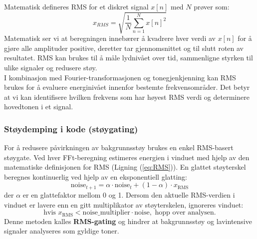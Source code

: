 Matematisk defineres RMS for et diskret signal $x[n]$ med $N$ prøver som:
\begin{equation}
    x_{RMS} = \sqrt{\frac{1}{N} \sum_{n=1}^{N} x[n]^2}
    \label{eq:RMS}
\end{equation}
\noindent
Matematisk ser vi at beregningen innebærer å kvadrere hver verdi av $x[n]$ for å gjøre alle amplituder positive, deretter tar gjennomsnittet og til slutt roten av resultatet. RMS kan brukes til å måle lydnivået over tid, sammenligne styrken til ulike signaler og redusere støy. \\
I kombinasjon med Fourier-transformasjonen og tonegjenkjenning kan RMS brukes for å evaluere energinivået innenfor bestemte frekvensområder. Det betyr at vi kan identifisere hvilken frekvens som har høyest RMS verdi og determinere hovedtonen i et signal.

\subsubsection{Støydemping i kode (støygating)}
For å redusere påvirkningen av bakgrunnsstøy brukes en enkel RMS-basert støygate. Ved hver FFt-beregning estimeres energien i vinduet med hjelp av den matematiske definisjonen for RMS (Ligning (\ref{eq:RMS})). En glattet støyterskel beregnes kontinuerlig ved hjelp av en eksponentiell glatting:
\[
\text{noise}_{t+1} = \alpha \cdot \text{noise}_t + (1 - \alpha) \cdot x_{\text{RMS}}
\]
der $\alpha$ er en glattefaktor mellom 0 og 1. 
Dersom den aktuelle RMS-verdien i vinduet er lavere enn en gitt multiplikator av støyterskelen, ignoreres vinduet:
\[
\text{hvis } x_{\text{RMS}} < \text{noise\_multiplier} \cdot \text{noise}, \text{ hopp over analysen.}
\]
Denne metoden kalles \textbf{RMS-gating} og hindrer at bakgrunnsstøy og lavintensive signaler analyseres som gyldige toner.
